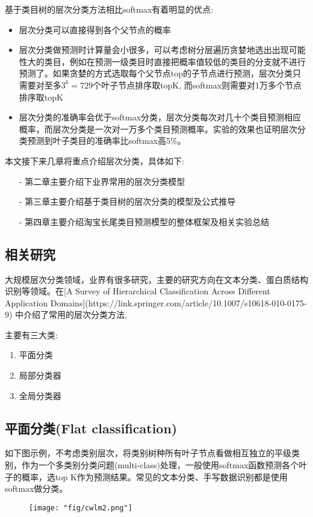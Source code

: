基于类目树的层次分类方法相比softmax有着明显的优点:
\begin{itemize}
\item 层次分类可以直接得到各个父节点的概率
\item 层次分类做预测时计算量会小很多，可以考虑树分层遍历贪婪地选出出现可能性大的类目，例如在预测一级类目时直接把概率值较低的类目的分支就不进行预测了。如果贪婪的方式选取每个父节点top的子节点进行预测，层次分类只需要对至多$3^{6}=729$个叶子节点排序取topK, 而softmax则需要对1万多个节点排序取topK
\item 层次分类的准确率会优于softmax分类，层次分类每次对几十个类目预测相应概率，而层次分类是一次对一万多个类目预测概率。实验的效果也证明层次分类预测到叶子类目的准确率比softmax高5\%。
\end{itemize}
本文接下来几章将重点介绍层次分类，具体如下:
\begin{itemize}
\item[-] 第二章主要介绍下业界常用的层次分类模型
\item[-] 第三章主要介绍基于类目树的层次分类的模型及公式推导
\item[-] 第四章主要介绍淘宝长尾类目预测模型的整体框架及相关实验总结
\end{itemize}
\subsection{相关研究}
大规模层次分类领域，业界有很多研究，主要的研究方向在文本分类、蛋白质结构识别等领域。在[A Survey of Hierarchical Classification Across Different Application Domains](https://link.springer.com/article/10.1007/s10618-010-0175-9) 中介绍了常用的层次分类方法, 
\par 主要有三大类:
\begin{enumerate}
\item 平面分类
\item 局部分类器
\item 全局分类器
\end{enumerate}

\subsection{平面分类(Flat classification)}
如下图示例，不考虑类别层次，将类别树种所有叶子节点看做相互独立的平级类别，作为一个多类别分类问题(multi-class)处理，一般使用softmax函数预测各个叶子的概率，选top K作为预测结果。常见的文本分类、手写数据识别都是使用softmax做分类。
\begin{figure}[!h]
	\centering
	\texttt{[image: "fig/cwlm2.png"]}
	\caption{}
	\label{fig:cwlm2}
\end{figure}

